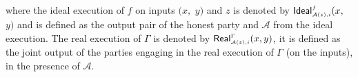  where the ideal execution of $f$ on inputs $(x,$ $ y)$ and $z$ is denoted by $\mathsf{Ideal}^{\scriptscriptstyle f}_{\scriptscriptstyle\mathcal{A}(z), i}(x,$ $y)$ and is defined as the output pair of the honest party and $\mathcal{A}$ from the ideal execution. The real execution of $\Gamma$ is denoted by $\mathsf{Real}^{\scriptscriptstyle \Gamma}_{\scriptscriptstyle\mathcal{A}(z), i}(x,y)$, it is defined as the joint output of the parties engaging in the real execution of $\Gamma$ (on the inputs), in the presence of $\mathcal{A}$.
  
  